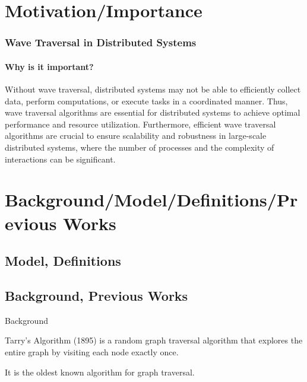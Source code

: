 \documentclass[11pt]{beamer}              %
\begin{document}
\section{Motivation/Importance}
\begin{frame}
\frametitle{Wave Traversal in Distributed Systems}
\framesubtitle{Why is it important?}
Without wave traversal, distributed systems may not be able to efficiently collect data, perform computations, or execute tasks in a coordinated manner. Thus, wave traversal algorithms are essential for distributed systems to achieve optimal performance and resource utilization.
Furthermore, efficient wave traversal algorithms are crucial to ensure scalability and robustness in large-scale distributed systems, where the number of processes and the complexity of interactions can be significant.
\end{frame}

\section{Background/Model/Definitions/Previous Works}


\subsection{Model, Definitions}


\subsection{Background, Previous Works}
\begin{frame}{Background}

Tarry's Algorithm (1895) is a random graph traversal algorithm that explores the entire graph by visiting each node exactly once.

It is the oldest known algorithm for graph traversal.

\end{frame}
\end{document}
